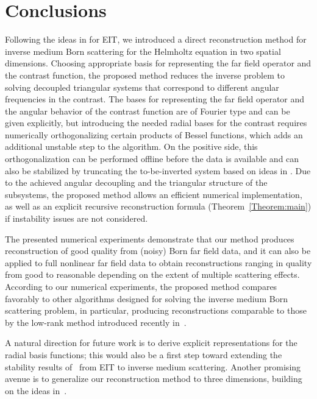 \documentclass[11pt,a4paper]{article}
\theoremstyle{definition}
\theoremstyle{remark} \newtheorem{remark}[theorem]{Remark}
\numberwithin{equation}{section}
\numberwithin{figure}{section}
\numberwithin{algorithm}{section}
\numberwithin{table}{section}
\begin{document}
\section*{Conclusions}
\label{sec:Conclusions}
Following the ideas in \cite{AutGarHirHvy24,GarHyv24} for EIT, we introduced a direct reconstruction method for inverse medium Born scattering for the Helmholtz equation in two spatial dimensions. Choosing appropriate basis for representing the far field operator and the contrast function, the proposed method reduces the inverse problem to solving decoupled triangular systems that correspond to different angular frequencies in the contrast. The bases for representing the far field operator and the angular behavior of the contrast function are of Fourier type and can be given explicitly, but introducing the needed radial bases for the contrast requires numerically orthogonalizing certain products of Bessel functions, which adds an additional unstable step to the algorithm. On the positive side, this orthogonalization can be performed offline before the data is available and can also be stabilized by truncating the to-be-inverted system based on ideas in \cite{GriSch24}. Due to the achieved angular decoupling and the triangular structure of the subsystems, the proposed method allows an efficient numerical implementation, as well as an explicit recursive reconstruction formula (Theorem~\ref{Theorem:main}) if instability issues are not considered.

The presented numerical experiments demonstrate that our method produces reconstruction of good quality from (noisy) Born far field data, and it can also be applied to full nonlinear far field data to obtain reconstructions ranging in quality from good to reasonable depending on the extent of multiple scattering effects. According to our numerical experiments, the proposed method compares favorably to other algorithms designed for solving the inverse medium Born scattering problem, in particular, producing reconstructions comparable to those by the low-rank method introduced recently
in~\cite{ZhoAudMenZha26}. 

A natural direction for future work is to derive explicit representations for the radial basis functions; this would also be a first step toward extending the stability results of~\cite{GarHyv24} from EIT to inverse medium scattering. Another promising avenue is to generalize our reconstruction method to three dimensions, building on the ideas in~\cite{Garde25}.
\end{document}

